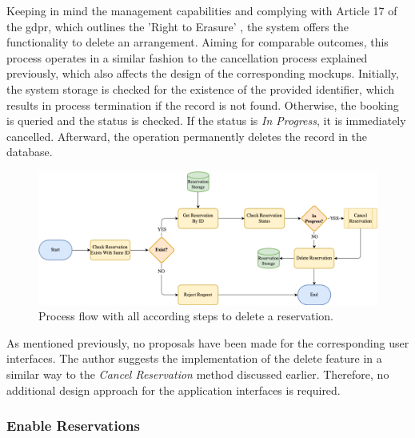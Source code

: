 Keeping in mind the management capabilities and complying with Article 17 of the \acrfull{gdpr}, which outlines the 'Right to Erasure' \cite{noauthor_art_2018}, the system offers the functionality to delete an arrangement.
Aiming for comparable outcomes, this process operates in a similar fashion to the cancellation process explained previously, which also affects the design of the corresponding mockups.
Initially, the system storage is checked for the existence of the provided identifier, which results in process termination if the record is not found. 
Otherwise, the booking is queried and the status is checked. If the status is \textit{In Progress}, it is immediately cancelled. Afterward, the operation permanently deletes the record in the database. 

\begin{figure}[h]
    \centering
    \includegraphics[scale=0.4]{resources/images/main/5_design/processes/ReservationDelete.png}
    \caption{Process flow with all according steps to delete a reservation.}
    \label{fig:delete-reservation-flowchart}
\end{figure}

\noindent As mentioned previously, no proposals have been made for the corresponding user interfaces. The author suggests the implementation of the delete feature in a similar way to the \textit{Cancel Reservation} method discussed earlier.
Therefore, no additional design approach for the application interfaces is required.

\newpage

\subsubsection{Enable Reservations}
\label{ch:Design:sec:Reservation System:ssec:Management Capabilities:sssec:Enable Reservations}

